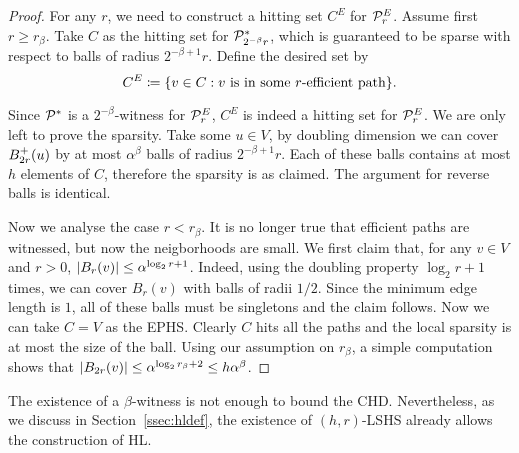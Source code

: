 \begin{proof}
	For any $r$, we need to construct a hitting set $C^E$ for $\mathcal{P}^E_r$.
	Assume first $r\geq r_\beta$.
	Take $C$ as the hitting set for $\mathcal{P}^*_{2^{-\beta}r}$, which is guaranteed to be sparse with respect to balls of radius $2^{-\beta+1}r$.
	Define the desired set by
	\[
	C^E\coloneqq\{v\in C: v \text{ is in some $r$-efficient path} \}.
	\]
	
	Since $\mathcal{P}^*$ is a $2^{-\beta}$-witness for $\mathcal{P}^E_r$, $C^E$ is indeed a hitting set for $\mathcal{P}^E_r$.
	We are only left to prove the sparsity.
	Take some $u\in V$, by doubling dimension we can cover $B^+_{2r}(u)$ by at most $\alpha^\beta$ balls of radius $2^{-\beta+1}r$.
	Each of these balls contains at most $h$ elements of $C$, therefore the sparsity is as claimed.
	The argument for reverse balls is identical.
	
	Now we analyse the case $r< r_\beta$.
	It is no longer true that efficient paths are witnessed, but now the neigborhoods are small.
	We first claim that, for any $v\in V$ and $r>0$, $\lvert B_{r}(v)\rvert\leq \alpha^{\log_2r+1}$.
	Indeed, using the doubling property $\log_2r+1$ times, we can cover $B_r(v)$ with balls of radii $1/2$.
	Since the minimum edge length is $1$, all of these balls must be singletons and the claim follows.
	Now we can take $C=V$ as the EPHS.
	Clearly $C$ hits all the paths and the local sparsity is at most the size of the ball.
	Using our assumption on $r_\beta$, a simple computation shows that $\lvert B_{2r}(v)\rvert\leq \alpha^{\log_2r_\beta+2}\leq h\alpha^\beta$. 
\end{proof}
\begin{remark}
	The existence of a $\beta$-witness is not enough to bound the CHD. 
	Nevertheless, as we discuss in Section~\ref{ssec:hldef}, the existence of $(h,r)$-LSHS already allows the construction of HL. 
\end{remark}
